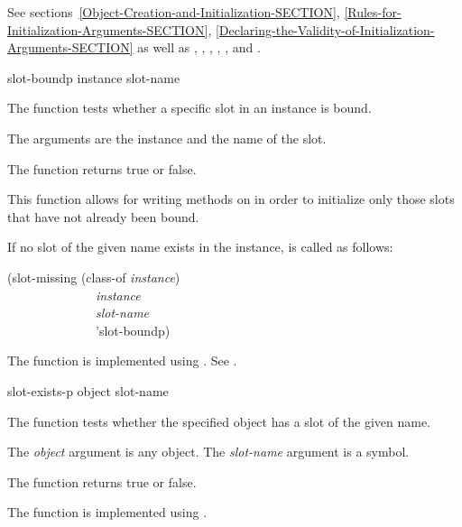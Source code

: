 \begin{defun}
See sections~\ref{Object-Creation-and-Initialization-SECTION},
\ref{Rules-for-Initialization-Arguments-SECTION},
\ref{Declaring-the-Validity-of-Initialization-Arguments-SECTION} as well as
,
,
,
,
,
and .
\end{defun}


\begin{defun}[Function]
slot-boundp instance slot-name

The function  tests whether a specific slot in an
instance is bound.





The arguments are the instance and the name of the slot.


The function  returns true or false.


This function allows for writing 
methods on  in order to initialize only
those slots that have not already been bound.

If no slot of the given name exists in the instance, 
is called as follows:
\begin{lisp}
(slot-missing (class-of \emph{instance\/}) \\
~~~~~~~~~~~~~~\emph{instance\/} \\
~~~~~~~~~~~~~~\emph{slot-name\/} \\
~~~~~~~~~~~~~~'slot-boundp)
\end{lisp}

The function  is implemented using 
.
See .
\end{defun}


\begin{defun}[Function]
slot-exists-p object slot-name

The function  tests whether the specified object has
a slot of the given name.





The \emph{object\/} argument is any object.  The \emph{slot-name\/} argument
is a symbol.


The function  returns true or false.


The function  is implemented using 
.

\end{defun}


